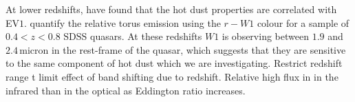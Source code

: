 At lower redshifts, \citet{shen14} have found that the hot dust properties are correlated with EV$1$. 
\citet{shen14} quantify the relative torus emission using the $r-W1$ colour for a sample of $0.4 < z < 0.8$ SDSS quasars. 
At these redshifts $W1$ is observing between $1.9$ and $2.4$\,micron in the rest-frame of the quasar, which suggests that they are sensitive to the same component of hot dust which we are investigating. 
Restrict redshift range t limit effect of band shifting due to redshift. 
Relative high flux in in the infrared than in the optical as Eddington ratio increases. 

